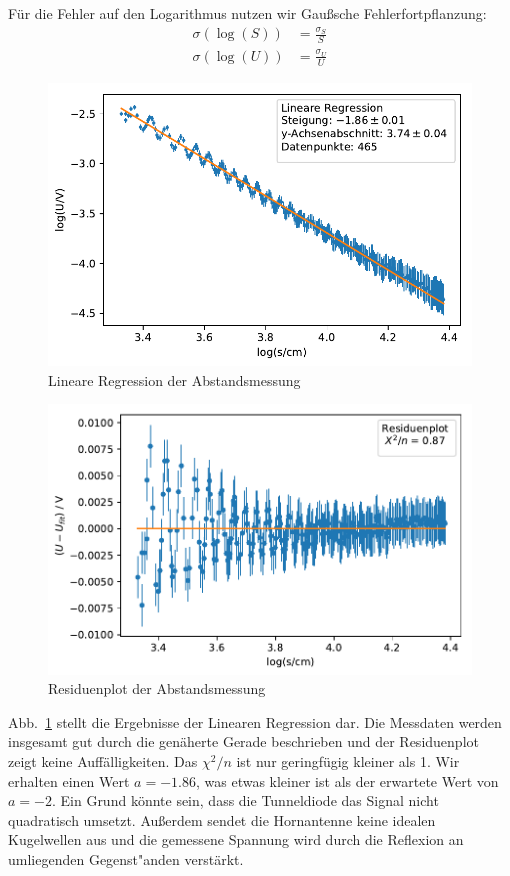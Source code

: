 \documentclass[12pt,a4paper]{article}
\begin{document}
Für die Fehler auf den Logarithmus nutzen wir Gaußsche Fehlerfortpflanzung:
\begin{align}
\sigma(\log(S))&=\frac{\sigma_S}{S}\\
\sigma(\log(U))&=\frac{\sigma_U}{U}
\end{align}
\begin{figure}
	\centering
	\includegraphics[scale=1]{Bilder/Abstandsabh_LinReg.pdf}
	\caption{Lineare Regression der Abstandsmessung}
	\label{Abstandsabh_LinReg}
\end{figure}
\begin{figure}
	\centering
	\includegraphics[scale=1]{Bilder/Abstandsabh_Residuen.pdf}
	\caption{Residuenplot der Abstandsmessung}
	\label{Abstandsabh_Residuenplot}
\end{figure}
Abb.~\ref{Abstandsabh_LinReg} stellt die Ergebnisse der Linearen Regression dar. Die Messdaten werden insgesamt gut durch die genäherte Gerade beschrieben und der Residuenplot zeigt keine Auffälligkeiten. Das $\chi^2/n$ ist nur geringfügig kleiner als 1. Wir erhalten einen Wert $a=-1.86$, was etwas kleiner ist als der erwartete Wert von $a=-2$. Ein Grund könnte sein, dass die Tunneldiode das Signal nicht quadratisch umsetzt. Außerdem sendet die Hornantenne keine idealen Kugelwellen aus und die gemessene Spannung wird durch die Reflexion an umliegenden Gegenst"anden verstärkt.
\newpage
\vphantom{v}
\newpage
\end{document}
